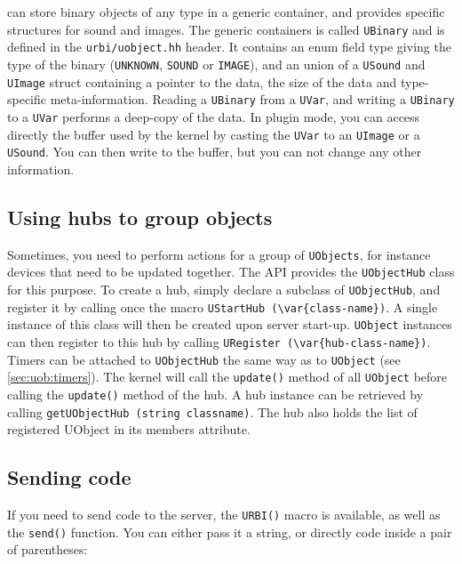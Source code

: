 \urbi can store binary objects of any type in a generic container, and
provides specific structures for sound and images. The generic
containers is called \lstinline{UBinary} and is defined in the
\lstinline{urbi/uobject.hh} header. It contains an enum field type
giving the type of the binary (\lstinline{UNKNOWN}, \lstinline{SOUND}
or \lstinline{IMAGE}), and an union of a \lstinline{USound} and
\lstinline{UImage} struct containing a pointer to the data, the size
of the data and type-specific meta-information. Reading a
\lstinline{UBinary} from a \lstinline{UVar}, and writing a
\lstinline{UBinary} to a \lstinline{UVar} performs a deep-copy of the
data. In plugin mode, you can access directly the buffer used by the
kernel by casting the \lstinline{UVar} to an \lstinline{UImage} or a
\lstinline{USound}. You can then write to the buffer, but you can not
change any other information.

\subsection{Using hubs to group objects}

Sometimes, you need to perform actions for a group of
\lstinline{UObjects}, for instance devices that need to be updated
together. The API provides the \lstinline{UObjectHub} class for this
purpose. To create a hub, simply declare a subclass of
\lstinline{UObjectHub}, and register it by calling once the macro
\lstinline|UStartHub (\var{class-name})|. A single instance of this class
will then be created upon server start-up. \lstinline{UObject}
instances can then register to this hub by calling
\lstinline|URegister (\var{hub-class-name})|. Timers can be attached to
\lstinline{UObjectHub} the same way as to \lstinline{UObject} (see
\autoref{sec:uob:timers}). The kernel will call the \lstinline{update()}
method of all \lstinline{UObject} before calling the
\lstinline{update()} method of the hub. A hub instance can be
retrieved by calling \lstinline{getUObjectHub (string classname)}. The
hub also holds the list of registered UObject in its members
attribute.

\subsection{Sending \urbi code}

If you need to send \urbi code to the server, the \lstinline{URBI()}
macro is available, as well as the \lstinline{send()} function. You
can either pass it a string, or directly \urbi code inside a pair of
parentheses:

